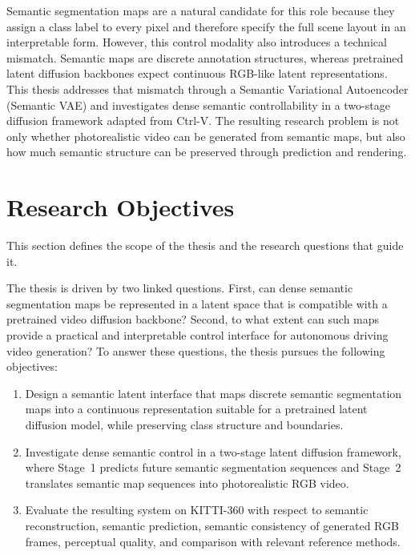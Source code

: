 Semantic segmentation maps are a natural candidate for this role because they assign a class label to every pixel and therefore specify the full scene layout in an interpretable form. However, this control modality also introduces a technical mismatch. Semantic maps are discrete annotation structures, whereas pretrained latent diffusion backbones expect continuous RGB-like latent representations. This thesis addresses that mismatch through a Semantic Variational Autoencoder (Semantic VAE) and investigates dense semantic controllability in a two-stage diffusion framework adapted from Ctrl-V. The resulting research problem is not only whether photorealistic video can be generated from semantic maps, but also how much semantic structure can be preserved through prediction and rendering.

\section{Research Objectives}
\label{sec:objectives}

This section defines the scope of the thesis and the research questions that guide it.

The thesis is driven by two linked questions. First, can dense semantic segmentation maps be represented in a latent space that is compatible with a pretrained video diffusion backbone? Second, to what extent can such maps provide a practical and interpretable control interface for autonomous driving video generation? To answer these questions, the thesis pursues the following objectives:

\begin{enumerate}
    \item Design a semantic latent interface that maps discrete semantic segmentation maps into a continuous representation suitable for a pretrained latent diffusion model, while preserving class structure and boundaries.
    
    \item Investigate dense semantic control in a two-stage latent diffusion framework, where Stage~1 predicts future semantic segmentation sequences and Stage~2 translates semantic map sequences into photorealistic RGB video.
    
    \item Evaluate the resulting system on KITTI-360 with respect to semantic reconstruction, semantic prediction, semantic consistency of generated RGB frames, perceptual quality, and comparison with relevant reference methods.
\end{enumerate}

